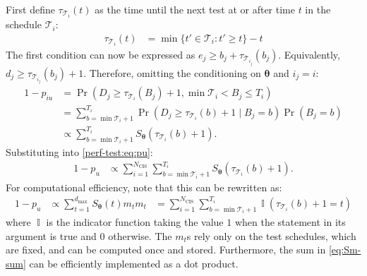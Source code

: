 \documentclass[12pt]{article}
\makeatletter
\DeclareMathOperator{\prob}{\mathrm{Pr}}
\DeclareMathOperator{\indicator}{\mathbb{I}}
\renewcommand{\vec}[1]{\bm{#1}}
\newcommand{\ssep}{:}
\newcommand{\dmax}{d_\text{max}}
\newcommand{\Ncis}{N_\text{CIS}}
\newcommand{\sched}{\mathcal{T}}
\DeclareRobustCommand\onedot{\futurelet\@let@token\@onedot}
\def\@onedot{\ifx\@let@token.\else.\null\fi\xspace}
\def\ie{i.e\onedot} \def\Ie{{I.e}\onedot}
\makeatother
\begin{document}
First define $\tau_{\sched_i}(t)$ as the time until the next test at or after time $t$ in the schedule $\sched_i$:
\begin{align}
\tau_{\sched_i}(t) &= \min \{ t' \in \sched_i : t' \geq t \} - t
\label{perf-test:eq:tau-def}
\end{align}
The first condition can now be expressed as $e_j \geq b_j + \tau_{\sched_{i_j}}(b_j)$.
Equivalently, $d_j \geq \tau_{\sched_{i_j}}(b_j) + 1$.
Therefore, omitting the conditioning on $\vec{\theta}$ and $i_j = i$:
\begin{align}
1 - p_{iu}
&= \prob(D_j \geq \tau_{\sched_{i}}(B_j)+ 1, \min \sched_{i} < B_j \leq T_{i}) \\
&= \sum_{b = \min \sched_{i} + 1}^{T_{i}} \prob(D_j \geq \tau_{\sched_{i}}(b) + 1 \mid B_j = b) \prob(B_j = b)\\
&\propto \sum_{b = \min \sched_{i} + 1}^{T_{i}} S_{\vec{\theta}}(\tau_{\sched_{i}}(b) + 1).
\label{perf-test:eq:piu}
\end{align}
Substituting into \cref{perf-test:eq:pu}:
\begin{align}
1 - p_u
& \propto \sum_{i=1}^{\Ncis} \sum_{b = \min \sched_{i} + 1}^{T_{i}} S_{\vec{\theta}}(\tau_{\sched_{i}}(b) + 1).
\end{align}
For computational efficiency, note that this can be rewritten as:
\begin{align}
  1- p_u
  &\propto \sum_{t=1}^{\dmax} S_{\vec\theta}(t) m_t
  \label{eq:Sm-sum}
  m_t &= \sum_{i=1}^{\Ncis} \sum_{b = \min \sched_{i} + 1}^{T_{i}} \indicator(\tau_{\sched_{i}}(b) + 1 = t)
\end{align}
where $\indicator$ is the indicator function taking the value $1$ when the statement in its argument is true and $0$ otherwise.
The $m_t$s rely only on the test schedules, which are fixed, and can be computed once and stored.
Furthermore, the sum in \cref{eq:Sm-sum} can be efficiently implemented as a dot product.
\end{document}

